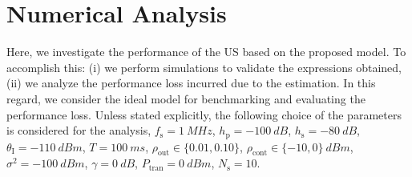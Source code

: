 \documentclass[12pt, draftclsnofoot, onecolumn]{IEEEtran}
\newcommand{\sub}[1]{_{\text{#1}}}
\newcommand{\opc}{\rho\sub{out}}
\newcommand{\pc}{\rho\sub{cont}}
\newcommand{\preg}{P\sub{cont}}
\newcommand{\prcvd}{P\sub{rcvd}}
\newcommand{\ptran}{P\sub{tran}}
\newcommand{\ite}{\theta\sub{I}}
\newcommand{\gp}{h\sub{p}}
\newcommand{\gs}{h\sub{s}}
\newcommand{\nps}{\sigma^2}
\newcommand{\fsam}{f\sub{s}}
\newcommand{\Ks}{N\sub{s}}
\begin{document}

 
\section{Numerical Analysis} \label{sec:num_ana}
Here, we investigate the performance of the US based on the proposed model. To accomplish this: (i) we perform simulations to validate the expressions obtained, (ii) we analyze the performance loss incurred due to the estimation. In this regard, we consider the ideal model for benchmarking and evaluating the performance loss. %
Unless stated explicitly, the following choice of the parameters is considered for the analysis, $\fsam = \SI{1}{MHz}$, $\gp = \SI{-100}{dB}$, $\gs = \SI{-80}{dB}$, $\ite = \SI{-110}{dBm}$, $T = \SI{100}{ms}$, $\opc \in \{0.01, 0.10\}$, $\pc \in \{-10, 0\} \SI{}{dBm}$, $\nps = \SI{-100}{dBm}$, $\gamma = \SI{0}{dB}$, $\ptran = \SI{0}{dBm}$, $\Ks = 10$.


\end{document}
